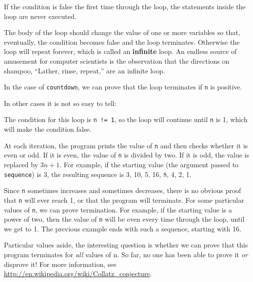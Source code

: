 \documentclass{book}
\begin{document}
If the condition is false the
first time through the loop, the statements inside the loop are
never executed.  


The body of the loop should change the value of
one or more variables so that, eventually, the condition becomes
false and the loop terminates.  Otherwise the loop will repeat
forever, which is called an {\bf infinite} loop.  An endless
source of amusement for computer scientists is the observation
that the directions on shampoo, ``Lather, rinse, repeat,'' are
an infinite loop.

In the case of {\tt countdown}, we can prove that the loop
terminates if {\tt n} is positive.

In other cases it is not so easy to tell:

%
The condition for this loop is {\tt n != 1}, so the loop
will continue until {\tt n} is 1, which will make the condition
false.

At each iteration, the program prints the value of {\tt n} and then
checks whether it is even or odd.  If it is even, the value of
{\tt n} is divided by two.  If it is odd, the value is replaced
by $3n+1$.  For example, if the starting value (the argument passed
to {\tt sequence}) is 3, the resulting sequence is
3, 10, 5, 16, 8, 4, 2, 1.

Since {\tt n} sometimes increases and sometimes decreases, there is no
obvious proof that {\tt n} will ever reach 1, or that the program will
terminate.  For some particular values of {\tt n}, we can prove
termination.  For example, if the starting value is a power of two, then
the value of {\tt n} will be even every time through the loop, until
we get to 1.  The previous example ends with such a sequence,
starting with 16.

Particular values aside, the interesting question is whether
we can prove that this program terminates for {\em all} values of n.
So far, no one has been able to prove it {\em or} disprove it!
For more information, see \url{http://en.wikipedia.org/wiki/Collatz_conjecture}.
\end{document}
